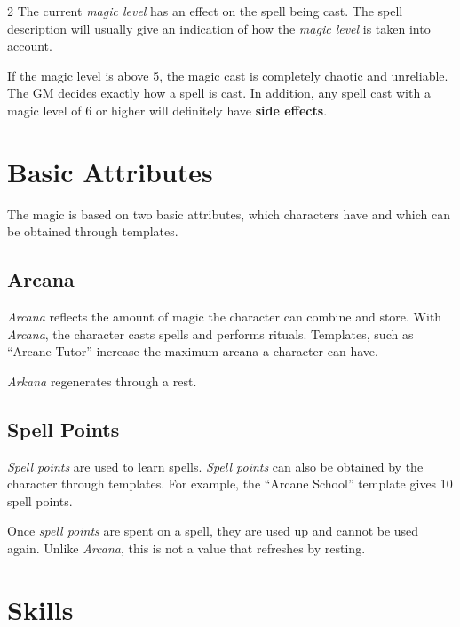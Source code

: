 \begin{multicols}{2}
The current \textit{magic level} has an effect on the spell being cast. The spell description will usually give an indication of how the \textit{magic level} is taken into account.

If the magic level is above 5, the magic cast is completely chaotic and unreliable. The GM decides exactly how a spell is cast. In addition, any spell cast with a magic level of 6 or higher will definitely have \textbf{side effects}.

\section{Basic Attributes}

The magic is based on two basic attributes, which characters have and which can be obtained through templates.

\subsection{Arcana}

\textit{Arcana} reflects the amount of magic the character can combine and store. With \textit{Arcana}, the character casts spells and performs rituals. Templates, such as ``Arcane Tutor'' increase the maximum arcana a character can have.

\textit{Arkana} regenerates through a rest.

\subsection{Spell Points}

\textit{Spell points} are used to learn spells. \textit{Spell points} can also be obtained by the character through templates. For example, the ``Arcane School'' template gives 10 spell points.

Once \textit{spell points} are spent on a spell, they are used up and cannot be used again. Unlike \textit{Arcana}, this is not a value that refreshes by resting.

\section{Skills}



\end{multicols}
